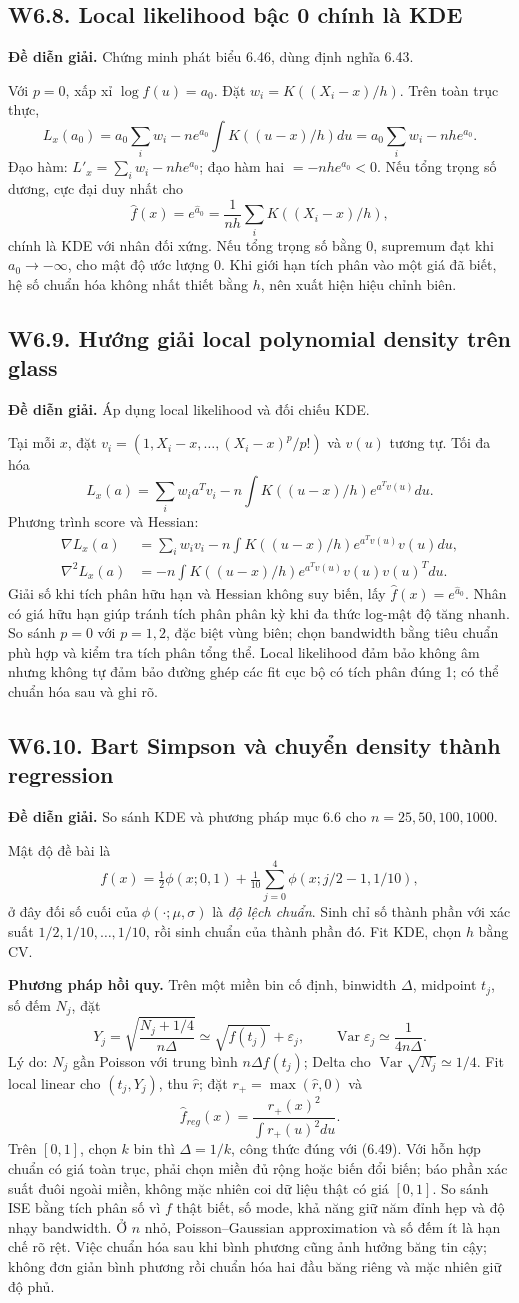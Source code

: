 \documentclass[11pt,a4paper]{article}
\DeclareMathOperator{\Var}{Var}\DeclareMathOperator{\Cov}{Cov}
\newcommand{\supp}[3]{\subsection{#1. #2}\label{s:#1}\textbf{Đề diễn giải.} #3\par}
\begin{document}
\supp{W6.8}{Local likelihood bậc 0 chính là KDE}{Chứng minh phát biểu 6.46, dùng định nghĩa 6.43.}
Với $p=0$, xấp xỉ $\log f(u)=a_0$. Đặt $w_i=K((X_i-x)/h)$. Trên toàn trục thực,
\[
L_x(a_0)=a_0\sum_iw_i-ne^{a_0}\int K((u-x)/h)du
=a_0\sum_iw_i-nhe^{a_0}.
\]
Đạo hàm: $L'_x=\sum_iw_i-nhe^{a_0}$; đạo hàm hai $=-nhe^{a_0}<0$. Nếu tổng trọng số dương, cực đại duy nhất cho
\[
\widehat f(x)=e^{\widehat a_0}=\frac1{nh}\sum_iK((X_i-x)/h),
\]
chính là KDE với nhân đối xứng. Nếu tổng trọng số bằng 0, supremum đạt khi $a_0\to-\infty$, cho mật độ ước lượng 0. Khi giới hạn tích phân vào một giá đã biết, hệ số chuẩn hóa không nhất thiết bằng $h$, nên xuất hiện hiệu chỉnh biên.

\supp{W6.9}{Hướng giải local polynomial density trên glass}{Áp dụng local likelihood và đối chiếu KDE.}
Tại mỗi $x$, đặt $v_i=(1,X_i-x,\ldots,(X_i-x)^p/p!)$ và $v(u)$ tương tự. Tối đa hóa
\[
L_x(a)=\sum_iw_i a^Tv_i-n\int K((u-x)/h)e^{a^Tv(u)}du.
\]
Phương trình score và Hessian:
\begin{align*}
\nabla L_x(a)&=\sum_iw_iv_i-n\int K((u-x)/h)e^{a^Tv(u)}v(u)du,\\
\nabla^2L_x(a)&=-n\int K((u-x)/h)e^{a^Tv(u)}v(u)v(u)^Tdu.
\end{align*}
Giải số khi tích phân hữu hạn và Hessian không suy biến, lấy $\widehat f(x)=e^{\widehat a_0}$. Nhân có giá hữu hạn giúp tránh tích phân phân kỳ khi đa thức log-mật độ tăng nhanh. So sánh $p=0$ với $p=1,2$, đặc biệt vùng biên; chọn bandwidth bằng tiêu chuẩn phù hợp và kiểm tra tích phân tổng thể. Local likelihood đảm bảo không âm nhưng không tự đảm bảo đường ghép các fit cục bộ có tích phân đúng 1; có thể chuẩn hóa sau và ghi rõ.

\supp{W6.10}{Bart Simpson và chuyển density thành regression}{So sánh KDE và phương pháp mục 6.6 cho $n=25,50,100,1000$.}
Mật độ đề bài là
\[
f(x)=\tfrac12\phi(x;0,1)+\tfrac1{10}\sum_{j=0}^4\phi(x;j/2-1,1/10),
\]
ở đây đối số cuối của $\phi(\cdot;\mu,\sigma)$ là \emph{độ lệch chuẩn}. Sinh chỉ số thành phần với xác suất $1/2,1/10,\ldots,1/10$, rồi sinh chuẩn của thành phần đó. Fit KDE, chọn $h$ bằng CV.

\textbf{Phương pháp hồi quy.} Trên một miền bin cố định, binwidth $\Delta$, midpoint $t_j$, số đếm $N_j$, đặt
\[
Y_j=\sqrt{\frac{N_j+1/4}{n\Delta}}\simeq\sqrt{f(t_j)}+\varepsilon_j,\qquad
\Var\varepsilon_j\simeq\frac1{4n\Delta}.
\]
Lý do: $N_j$ gần Poisson với trung bình $n\Delta f(t_j)$; Delta cho $\Var\sqrt{N_j}\simeq1/4$. Fit local linear cho $(t_j,Y_j)$, thu $\widehat r$; đặt $r_+=\max(\widehat r,0)$ và
\[
\widehat f_{reg}(x)=\frac{r_+(x)^2}{\int r_+(u)^2du}.
\]
Trên $[0,1]$, chọn $k$ bin thì $\Delta=1/k$, công thức đúng với (6.49). Với hỗn hợp chuẩn có giá toàn trục, phải chọn miền đủ rộng hoặc biến đổi biến; báo phần xác suất đuôi ngoài miền, không mặc nhiên coi dữ liệu thật có giá $[0,1]$. So sánh ISE bằng tích phân số vì $f$ thật biết, số mode, khả năng giữ năm đỉnh hẹp và độ nhạy bandwidth. Ở $n$ nhỏ, Poisson--Gaussian approximation và số đếm ít là hạn chế rõ rệt. Việc chuẩn hóa sau khi bình phương cũng ảnh hưởng băng tin cậy; không đơn giản bình phương rồi chuẩn hóa hai đầu băng riêng và mặc nhiên giữ độ phủ.
\end{document}
